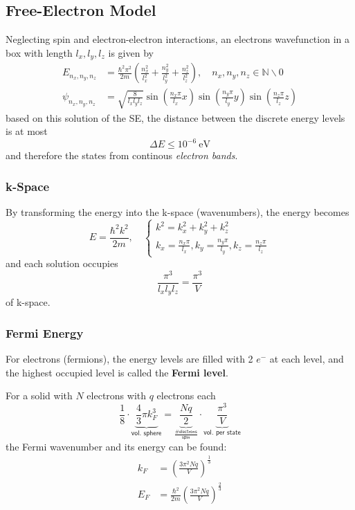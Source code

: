 \subsection{Free-Electron Model}
Neglecting spin and electron-electron interactions, an electrons wavefunction in a box with length $l_x,l_y,l_z$ is given by
\noindent\begin{align*}
    E_{n_x,n_y,n_z}    & = \frac{\hbar^2\pi^2}{2m}\left(\frac{n_x^2}{l_x^2}+\frac{n_y^2}{l_y^2}+\frac{n_z^2}{l_z^2}\right),\quad n_x,n_y,n_z \in \mathbb{N}\backslash 0 \\
    \psi_{n_x,n_y,n_z} & = \sqrt{\frac{8}{l_x l_y l_z}} \sin\left(\frac{n_x\pi}{l_x}x\right) \sin\left(\frac{n_y\pi}{l_y}y\right) \sin\left(\frac{n_z\pi}{l_z}z\right)
\end{align*}
based on this solution of the SE, the distance between the discrete energy levels is at most
\noindent\begin{equation*}
    \Delta E \leq 10^{-6} ~\mathrm{eV}
\end{equation*}
and therefore the states from continous \textit{electron bands}.


\subsubsection{k-Space}
By transforming the energy into the k-space (wavenumbers), the energy becomes
\noindent\begin{equation*}
    E = \frac{\hbar^2k^2}{2m}, \quad \begin{cases}
        k^2 = k_x^2+k_y^2+k_z^2 \\
        k_x = \frac{n_x\pi}{l_x}, k_y = \frac{n_y\pi}{l_y}, k_z = \frac{n_z\pi}{l_z}
    \end{cases}
\end{equation*}
and each solution occupies
\noindent\begin{equation*}
    \frac{\pi^3}{l_x l_y l_z}=\frac{\pi^3}{V}
\end{equation*}
of k-space.

\subsubsection{Fermi Energy}
For electrons (fermions), the energy levels are filled with 2 $e^-$ at each level, and the highest occupied level is called the \textbf{Fermi level}.

\newpar{}
For a solid with $N$ electrons with $q$ electrons each
\noindent\begin{equation*}
    \frac{1}{8}\cdot\underbrace{\frac{4}{3}\pi k_F^3}_{\textsf{vol. sphere}} = \underbrace{\frac{Nq}{2}}_{\frac{\textsf{\# electrons}}{\mathsf{spin}}}\cdot \underbrace{\frac{\pi^3}{V}}_{\textsf{vol. per state}}
\end{equation*}
the Fermi wavenumber and its energy can be found:
\noindent\begin{align*}
    k_F & = {\left(\frac{3\pi^2 N q}{V}\right)}^{\frac{1}{3}}                   \\
    E_F & = \frac{\hbar^2}{2m}{\left(\frac{3\pi^2 N q}{V}\right)}^{\frac{2}{3}}
\end{align*}

